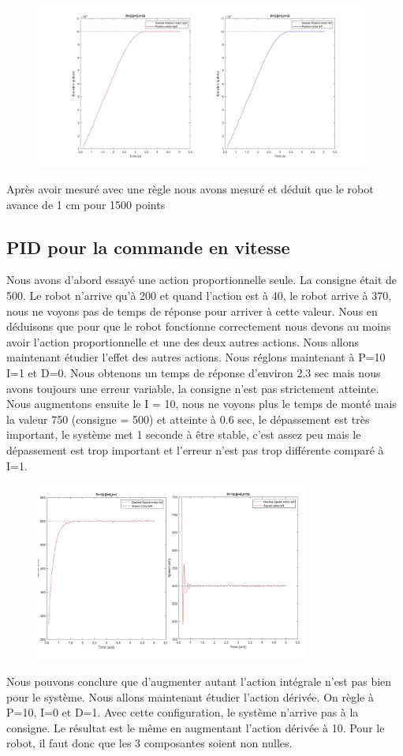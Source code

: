 \documentclass[a4paper]{article}
\begin{document}
		\begin{figure}[h]
			\centering
			\includegraphics[width = 11cm]{imgs/fig5.jpg}
			\caption{}
		\end{figure}
		Après avoir mesuré avec une règle nous avons mesuré et déduit que le robot avance de 1 cm pour 1500 points 
		
	\subsection{PID pour la commande en vitesse}
	
		Nous avons d’abord essayé une action proportionnelle seule. La consigne était de 500. Le robot n’arrive qu'à 200 et quand l’action est à 40, le robot arrive à 370, nous ne voyons pas de temps de réponse pour arriver à cette valeur. Nous en déduisons que pour que le robot fonctionne correctement nous devons au moins avoir l’action proportionnelle et une des deux autres actions.
		Nous allons maintenant étudier l’effet des autres actions.
		Nous réglons maintenant à P=10 I=1 et D=0. Nous obtenons un temps de réponse d’environ 2.3 sec mais nous avons toujours une erreur variable, la consigne n’est pas strictement atteinte.
		Nous augmentons ensuite le I = 10, nous ne voyons plus le temps de monté mais la valeur 750 (consigne = 500) et atteinte à 0.6 sec, le dépassement est très important, le système met 1 seconde à être stable, c’est assez peu mais le dépassement est trop important et l’erreur n’est pas trop différente comparé à I=1.
		\begin{figure}[h]
			\centering
			\includegraphics[width = 9cm]{imgs/fig6.png}
			\caption{}
		\end{figure}
		Nous pouvons conclure que d’augmenter autant l’action intégrale n’est pas bien pour le système.
		Nous allons maintenant étudier l’action dérivée. On règle à P=10, I=0 et D=1. Avec cette configuration, le système n’arrive pas à la consigne.  Le résultat est le même en augmentant l’action dérivée à 10. Pour le robot, il faut donc que les 3 composantes soient non nulles.
		
\end{document}
